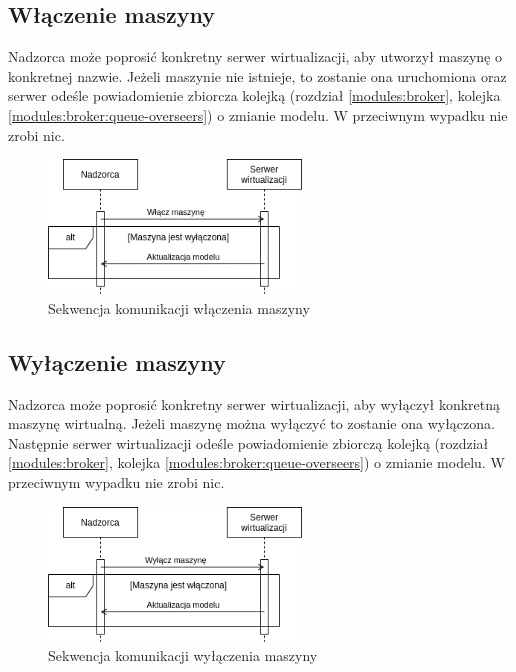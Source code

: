 \documentclass[../opis-rozwiazania.tex]{subfiles}
\begin{document}
\subsection{Włączenie maszyny}

Nadzorca może poprosić konkretny serwer wirtualizacji, aby utworzył maszynę o konkretnej nazwie.
Jeżeli maszynie nie istnieje, to zostanie ona uruchomiona oraz serwer odeśle powiadomienie zbiorcza kolejką (rozdział \ref{modules:broker}, kolejka \ref{modules:broker:queue-overseers}) o zmianie modelu.
W przeciwnym wypadku nie zrobi nic.

\begin{figure}[H]
  \centering
  \includegraphics[width=0.6\textwidth]{../diagrams/sequence_diagrams/wlaczenie_maszyny.png}
  \caption{Sekwencja komunikacji włączenia maszyny}
  \label{figure:diagrams:sequence_diagrams:wlaczenie_maszyny}
\end{figure}

\subsection{Wyłączenie maszyny}

Nadzorca może poprosić konkretny serwer wirtualizacji, aby wyłączył konkretną maszynę wirtualną.
Jeżeli maszynę można wyłączyć to zostanie ona wyłączona.
Następnie serwer wirtualizacji odeśle powiadomienie zbiorczą kolejką (rozdział \ref{modules:broker}, kolejka \ref{modules:broker:queue-overseers}) o zmianie modelu.
W przeciwnym wypadku nie zrobi nic.

\begin{figure}[H]
  \centering
  \includegraphics[width=0.6\textwidth]{../diagrams/sequence_diagrams/wylaczenie_maszyny.png}
  \caption{Sekwencja komunikacji wyłączenia maszyny}
  \label{figure:diagrams:sequence_diagrams:wylaczenie_maszyny}
\end{figure}
\end{document}
